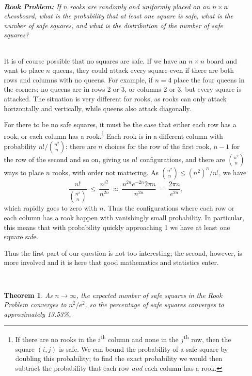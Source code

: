 \documentclass[12pt,reqno]{amsart}
\numberwithin{equation}{section}
\newtheorem{thm}{Theorem}[section]
\theoremstyle{plain}
\newcommand\be{\begin{equation}}
\newcommand\ee{\end{equation}}
\newcommand{\ncr}[2]{{#1 \choose #2}}
\begin{document}
\ \\

\noindent \emph{\textbf{Rook Problem:} If $n$ rooks are randomly and uniformly placed on an $n\times n$ chessboard, what is the probability that at least one square is safe, what is the number of safe squares, and what is the distribution of the number of safe squares?}

\ \\

It is of course possible that no squares are safe. If we have an $n\times n$ board and want to place $n$ queens, they could attack every square even if there are both rows and columns with no queens. For example, if $n=4$ place the four queens in the corners; no queens are in rows 2 or 3, or columns 2 or 3, but every square is attacked. The situation is very different for rooks, as rooks can only attack horizontally and vertically, while queens also attack diagonally.

For there to be no safe squares, it must be the case that either each row has a rook, or each column has a rook.\footnote{If there are no rooks in the $i$\textsuperscript{th} column and none in the $j$\textsuperscript{th} row, then the square $(i,j)$ is safe. We can bound the probability of a safe square by doubling this probability; to find the exact probability we would then subtract the probability that each row \emph{and} each column has a rook.} Each rook is in a different column with probability $n! / \ncr{n^2}{n}$: there are $n$ choices for the row of the first rook, $n-1$ for the row of the second and so on, giving us $n!$ configurations, and there are $\ncr{n^2}{n}$ ways to place $n$ rooks, with order not mattering. As $\ncr{n^2}{n} \le (n^2)^n/n!$, we have \be \frac{n!}{\ncr{n^2}{n}} \ \le \ \frac{n!^2}{n^{2n}} \ \approx \ \frac{n^{2n} e^{-2n} 2 \pi n}{n^{2n}} \ = \ \frac{2\pi n}{e^{2n}}, \ee which rapidly goes to zero with $n$. Thus the configurations where each row or each column has a rook happen with vanishingly small probability. In particular, this means that with probability quickly approaching 1 we have at least one square safe.

Thus the first part of our question is not too interesting; the second, however, is more involved and it is here that good mathematics and statistics enter.

\ \\

\begin{thm} As $n \to \infty$, the expected number of safe squares in the Rook Problem converges to $n^2/e^2$, so the percentage of safe squares converges to approximately 13.53\%.
\end{thm}
\end{document}
